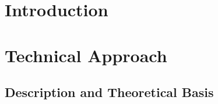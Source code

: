\documentclass[12pt,twoside,letterpaper]{article}
\begin{document}

\tableofcontents
\newpage
\newpage

\section{Introduction}
\lipsum
\clearpage

\section{Technical Approach}
\subsection{Description and Theoretical Basis}
\lipsum
\clearpage
\end{document}

